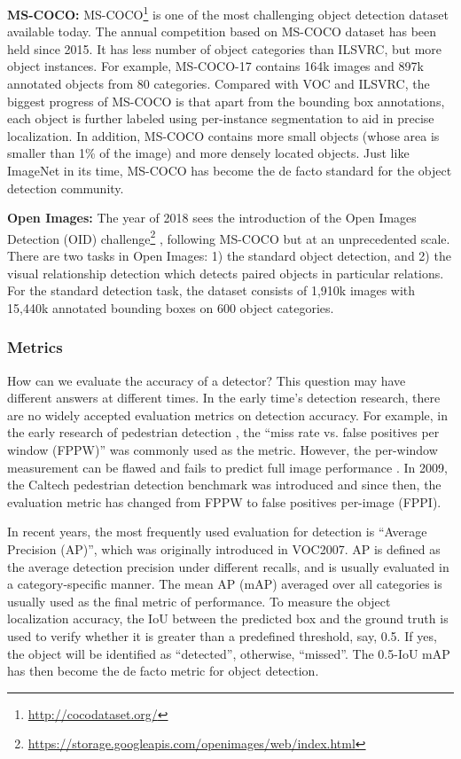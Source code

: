 \documentclass[lettersize,journal]{IEEEtran}
\begin{document}
\textbf{MS-COCO:}
MS-COCO\footnote{\url{http://cocodataset.org/}} \cite{ECCV14-COCO} is one of the most challenging object detection dataset available today. The annual competition based on MS-COCO dataset has been held since 2015. It has less number of object categories than ILSVRC, but more object instances. For example, MS-COCO-17 contains 164k images and 897k annotated objects from 80 categories. Compared with VOC and ILSVRC, the biggest progress of MS-COCO is that apart from the bounding box annotations, each object is further labeled using per-instance segmentation to aid in precise localization. In addition, MS-COCO contains more small objects (whose area is smaller than 1\% of the image) and more densely located objects.
Just like ImageNet in its time, MS-COCO has become the de facto standard for the object detection community.

\textbf{Open Images:}
The year of 2018 sees the introduction of the Open Images Detection (OID) challenge\footnote{\url{https://storage.googleapis.com/openimages/web/index.html}} \cite{Online-OpenImages}, following MS-COCO but at an unprecedented scale. There are two tasks in Open Images: 1) the standard object detection, and 2) the visual relationship detection which detects paired objects in particular relations. For the standard detection task, the dataset consists of 1,910k images with 15,440k annotated bounding boxes on 600 object categories.

\subsubsection{Metrics}

How can we evaluate the accuracy of a detector? This question may have different answers at different times. In the early time's detection research, there are no widely accepted evaluation metrics on detection accuracy. For example, in the early research of pedestrian detection \cite{CVPR05-HOG}, the ``miss rate vs. false positives per window (FPPW)'' was commonly used as the metric. However, the per-window measurement can be flawed and fails to predict full image performance \cite{CVPR09-CaltechDataset}. In 2009, the Caltech pedestrian detection benchmark was introduced \cite{CVPR09-CaltechDataset, TPAMI12-CaltechDataset} and since then, the evaluation metric has changed from FPPW to false positives per-image (FPPI).

In recent years, the most frequently used evaluation for detection is ``Average Precision (AP)'', which was originally introduced in VOC2007. AP is defined as the average detection precision under different recalls, and is usually evaluated in a category-specific manner. The mean AP (mAP) averaged over all categories is usually used as the final metric of performance. To measure the object localization accuracy, the IoU between the predicted box and the ground truth is used to verify whether it is greater than a predefined threshold, say, 0.5. If yes, the object will be identified as ``detected'', otherwise, ``missed''. The 0.5-IoU mAP has then become the de facto metric for object detection.
\end{document}
